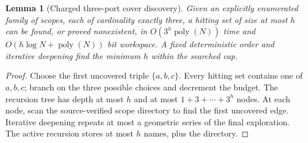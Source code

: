 \documentclass[10pt]{article}
\newtheorem{lemma}[theorem]{Lemma}
\newcommand{\poly}{\operatorname{poly}}
\begin{document}
\begin{lemma}[Charged three-port cover discovery]\label{lem:search}
Given an explicitly enumerated family of scopes, each of cardinality exactly three, a hitting set of size at most $h$ can be found, or proved nonexistent, in $O(3^h\poly(N))$ time and $O(h\log N+\poly(N))$ bit workspace. A fixed deterministic order and iterative deepening find the minimum $h$ within the searched cap.
\end{lemma}
\begin{proof}
Choose the first uncovered triple $\{a,b,c\}$. Every hitting set contains one of $a,b,c$; branch on the three possible choices and decrement the budget. The recursion tree has depth at most $h$ and at most $1+3+\cdots+3^h$ nodes. At each node, scan the source-verified scope directory to find the first uncovered edge. Iterative deepening repeats at most a geometric series of the final exploration. The active recursion stores at most $h$ names, plus the directory.\end{proof}
\end{document}
